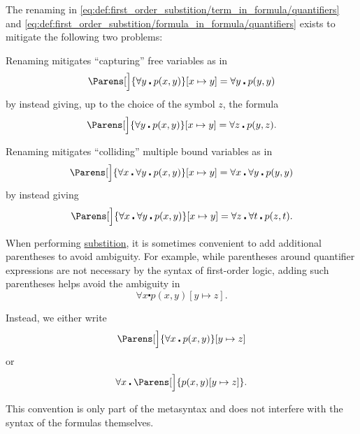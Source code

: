 \begin{remark}\label{rem:first_order_substitution_renaming_justification}
  The renaming in \eqref{eq:def:first_order_substition/term_in_formula/quantifiers} and \eqref{eq:def:first_order_substition/formula_in_formula/quantifiers} exists to mitigate the following two problems:

  \begin{RemEnum}
     Renaming mitigates \enquote{capturing} free variables as in
    \begin{equation*}
      \Parens[\Big]{ \forall y \centerdot p(x, y) }[x \mapsto y] = \forall y \centerdot p(y, y)
    \end{equation*}
    by instead giving, up to the choice of the symbol \( z \), the formula
    \begin{equation*}
      \Parens[\Big]{ \forall y \centerdot p(x, y) }[x \mapsto y] = \forall z \centerdot p(y, z).
    \end{equation*}

     Renaming mitigates \enquote{colliding} multiple bound variables as in
    \begin{equation*}
      \Parens[\Big]{ \forall x \centerdot \forall y \centerdot p(x, y) }[x \mapsto y] = \forall x \centerdot \forall y \centerdot p(y, y)
    \end{equation*}
    by instead giving
    \begin{equation*}
      \Parens[\Big]{ \forall x \centerdot \forall y \centerdot p(x, y) }[x \mapsto y] = \forall z \centerdot \forall t \centerdot p(z, t).
    \end{equation*}
  \end{RemEnum}
\end{remark}

\begin{remark}\label{rem:first_order_substition_parentheses}
  When performing \hyperref[def:propositional_substitution]{substition}, it is sometimes convenient to add additional parentheses to avoid ambiguity. For example, while parentheses around quantifier expressions are not necessary by the syntax of first-order logic, adding such parentheses helps avoid the ambiguity in
  \begin{equation*}
    \forall x \centerdot p(x, y) [y \mapsto z].
  \end{equation*}

  Instead, we either write
  \begin{equation*}
    \Parens[\Big]{ \forall x \centerdot p(x, y) } [y \mapsto z]
  \end{equation*}
  or
  \begin{equation*}
    \forall x \centerdot \Parens[\Big]{ p(x, y)[y \mapsto z] }.
  \end{equation*}

  This convention is only part of the metasyntax and does not interfere with the syntax of the formulas themselves.
\end{remark}


